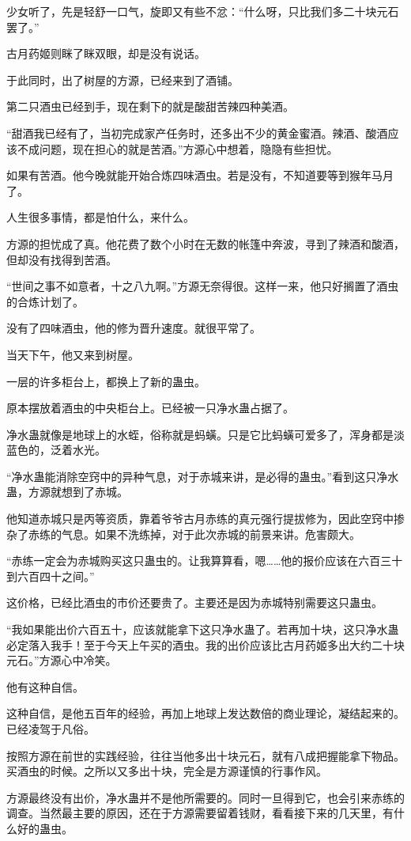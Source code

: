 \begin{this_body}
少女听了，先是轻舒一口气，旋即又有些不忿：“什么呀，只比我们多二十块元石罢了。”

古月药姬则眯了眯双眼，却是没有说话。

于此同时，出了树屋的方源，已经来到了酒铺。

第二只酒虫已经到手，现在剩下的就是酸甜苦辣四种美酒。

“甜酒我已经有了，当初完成家产任务时，还多出不少的黄金蜜酒。辣酒、酸酒应该不成问题，现在担心的就是苦酒。”方源心中想着，隐隐有些担忧。

如果有苦酒。他今晚就能开始合炼四味酒虫。若是没有，不知道要等到猴年马月了。

人生很多事情，都是怕什么，来什么。

方源的担忧成了真。他花费了数个小时在无数的帐篷中奔波，寻到了辣酒和酸酒，但却没有找得到苦酒。

“世间之事不如意者，十之八九啊。”方源无奈得很。这样一来，他只好搁置了酒虫的合炼计划了。

没有了四味酒虫，他的修为晋升速度。就很平常了。

当天下午，他又来到树屋。

一层的许多柜台上，都换上了新的蛊虫。

原本摆放着酒虫的中央柜台上。已经被一只净水蛊占据了。

净水蛊就像是地球上的水蛭，俗称就是蚂蟥。只是它比蚂蟥可爱多了，浑身都是淡蓝色的，泛着水光。

“净水蛊能消除空窍中的异种气息，对于赤城来讲，是必得的蛊虫。”看到这只净水蛊，方源就想到了赤城。

他知道赤城只是丙等资质，靠着爷爷古月赤练的真元强行提拔修为，因此空窍中掺杂了赤练的气息。如果不洗练掉，对于此次赤城的前景来讲。危害颇大。

“赤练一定会为赤城购买这只蛊虫的。让我算算看，嗯……他的报价应该在六百三十到六百四十之间。”

这价格，已经比酒虫的市价还要贵了。主要还是因为赤城特别需要这只蛊虫。

“我如果能出价六百五十，应该就能拿下这只净水蛊了。若再加十块，这只净水蛊必定落入我手！至于今天上午买的酒虫。我的出价应该比古月药姬多出大约二十块元石。”方源心中冷笑。

他有这种自信。

这种自信，是他五百年的经验，再加上地球上发达数倍的商业理论，凝结起来的。已经凌驾于凡俗。

按照方源在前世的实践经验，往往当他多出十块元石，就有八成把握能拿下物品。买酒虫的时候。之所以又多出十块，完全是方源谨慎的行事作风。

方源最终没有出价，净水蛊并不是他所需要的。同时一旦得到它，也会引来赤练的调查。当然最主要的原因，还在于方源需要留着钱财，看看接下来的几天里，有什么好的蛊虫。


\end{this_body}
